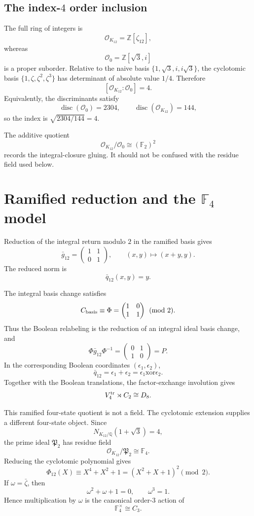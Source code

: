 \documentclass[11pt]{article}
\theoremstyle{definition}
\theoremstyle{remark}
\newcommand{\Q}{\mathbb Q}
\newcommand{\Z}{\mathbb Z}
\newcommand{\F}{\mathbb F}
\newcommand{\OO}{\mathcal O}
\newcommand{\disc}{\operatorname{disc}}
\begin{document}
\subsection{The index-$4$ order inclusion}

The full ring of integers is
\[
\OO_{K_{12}}=\Z[\zeta_{12}],
\]
whereas
\[
\OO_0=\Z[\sqrt3,i]
\]
is a proper suborder.  Relative to the naive basis
$\{1,\sqrt3,i,i\sqrt3\}$, the cyclotomic basis
$\{1,\zeta,\zeta^2,\zeta^3\}$ has determinant of absolute value $1/4$.
Therefore
\[
\boxed{[\OO_{K_{12}}:\OO_0]=4.}
\]
Equivalently, the discriminants satisfy
\[
\disc(\OO_0)=2304,
\qquad
\disc(\OO_{K_{12}})=144,
\]
so the index is $\sqrt{2304/144}=4$.

The additive quotient
\[
\OO_{K_{12}}/\OO_0\cong(\F_2)^2
\]
records the integral-closure gluing.  It should not be confused with the
residue field used below.

\section{Ramified reduction and the $\F_4$ model}

Reduction of the integral return modulo $2$ in the ramified basis gives
\[
\bar g_{12}
=\begin{pmatrix}1&1\\0&1\end{pmatrix},
\qquad
(x,y)\mapsto(x+y,y).
\]
The reduced norm is
\[
\bar q_{12}(x,y)=y.
\]

The integral basis change satisfies
\[
C_{\rm basis}\equiv
\Phi=\begin{pmatrix}1&0\\1&1\end{pmatrix}\pmod2.
\]
Thus the Boolean relabeling is the reduction of an integral ideal basis
change, and
\[
\Phi\bar g_{12}\Phi^{-1}
=\begin{pmatrix}0&1\\1&0\end{pmatrix}=P.
\]
In the corresponding Boolean coordinates
$(\epsilon_1,\epsilon_2)$,
\[
\bar q_{12}=\epsilon_1+\epsilon_2
=\epsilon_1\mathbin{\mathrm{xor}}\epsilon_2.
\]
Together with the Boolean translations, the factor-exchange involution gives
\[
V_4^{\rm tr}\rtimes C_2\cong D_8.
\]

This ramified four-state quotient is not a field.  The cyclotomic extension
supplies a different four-state object.  Since
\[
N_{K_{12}/\Q}(1+\sqrt3)=4,
\]
the prime ideal $\mathfrak P_2$ has residue field
\[
\boxed{\OO_{K_{12}}/\mathfrak P_2\cong\F_4.}
\]
Reducing the cyclotomic polynomial gives
\[
\Phi_{12}(X)
\equiv X^4+X^2+1
=(X^2+X+1)^2\pmod2.
\]
If $\omega=\bar\zeta$, then
\[
\omega^2+\omega+1=0,
\qquad
\omega^3=1.
\]
Hence multiplication by $\omega$ is the canonical order-$3$ action of
\[
\F_4^\times\cong C_3.
\]
\end{document}
